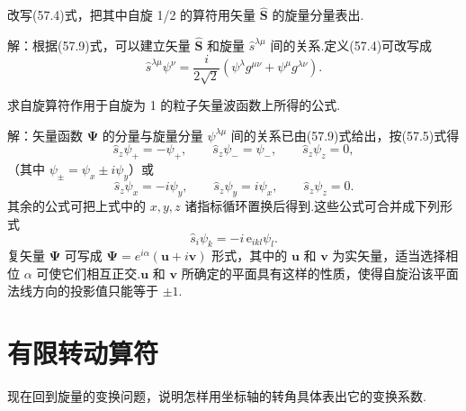 \begin{xiti}

\quad 改写(57.4)式，把其中自旋 1/2 的算符用矢量 $\hat{\boldsymbol{S}}$ 的旋量分量表出.

解：根据(57.9)式，可以建立矢量 $\hat{\boldsymbol{S}}$ 和旋量 $\hat{s}^{\lambda\mu}$ 间的关系.定义(57.4)可改写成
\begin{equation*}
  \hat{s}^{\lambda\mu}\psi^{\nu}
  =\frac{i}{2\sqrt{2}}\left(\psi^{\lambda}g^{\mu\nu}+\psi^{\mu}g^{\lambda\nu}\right).
\end{equation*}

\quad 求自旋算符作用于自旋为 1 的粒子矢量波函数上所得的公式.

解：矢量函数 $\boldsymbol{\Psi}$ 的分量与旋量分量 $\psi^{\lambda\mu}$ 间的关系已由(57.9)式给出，按(57.5)式得
\begin{equation*}
  \hat{s}_z\psi_+=-\psi_+,\qquad
  \hat{s}_z\psi_-=\psi_-,\qquad
  \hat{s}_z\psi_z=0,
\end{equation*}
（其中 $\psi_\pm=\psi_x\pm i\psi_y$）或
\begin{equation*}
  \hat{s}_z\psi_x=-i\psi_y,\qquad
  \hat{s}_z\psi_y=i\psi_x,\qquad
  \hat{s}_z\psi_z=0.
\end{equation*}
其余的公式可把上式中的 $x,y,z$ 诸指标循环置换后得到.这些公式可合并成下列形式
\begin{equation*}
  \hat{s}_i\psi_k=-i\,\mathrm{e}_{ikl}\psi_l.
\end{equation*}
复矢量 $\boldsymbol{\Psi}$ 可写成 $\boldsymbol{\Psi}=e^{i\alpha}(\boldsymbol{u}+i\boldsymbol{v})$ 形式，其中的 $\boldsymbol{u}$ 和 $\boldsymbol{v}$ 为实矢量，适当选择相位 $\alpha$ 可使它们相互正交.$\boldsymbol{u}$ 和 $\boldsymbol{v}$ 所确定的平面具有这样的性质，使得自旋沿该平面法线方向的投影值只能等于 $\pm1$.

\end{xiti}

\section{有限转动算符}

现在回到旋量的变换问题，说明怎样用坐标轴的转角具体表出它的变换系数.

